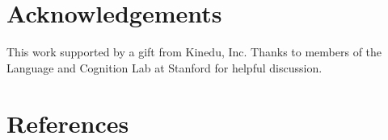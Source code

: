 \documentclass[10pt, letterpaper]{article}
\begin{document}
\section{Acknowledgements}\label{acknowledgements}

This work supported by a gift from Kinedu, Inc. Thanks to members of the
Language and Cognition Lab at Stanford for helpful discussion.

\section{References}\label{references}

\small
\end{document}

